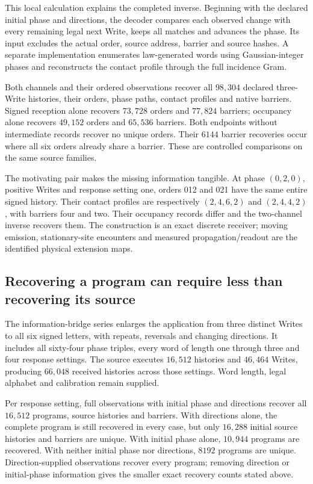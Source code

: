 This local calculation explains the completed inverse. Beginning with the declared initial phase and directions, the decoder compares each observed change with every remaining legal next Write, keeps all matches and advances the phase. Its input excludes the actual order, source address, barrier and source hashes. A separate implementation enumerates law-generated words using Gaussian-integer phases and reconstructs the contact profile through the full incidence Gram.

Both channels and their ordered observations recover all $98{,}304$ declared three-Write histories, their orders, phase paths, contact profiles and native barriers. Signed reception alone recovers $73{,}728$ orders and $77{,}824$ barriers; occupancy alone recovers $49{,}152$ orders and $65{,}536$ barriers. Both endpoints without intermediate records recover no unique orders. Their $6144$ barrier recoveries occur where all six orders already share a barrier. These are controlled comparisons on the same source families.

The motivating pair makes the missing information tangible. At phase $(0,2,0)$, positive Writes and response setting one, orders 012 and 021 have the same entire signed history. Their contact profiles are respectively $(2,4,6,2)$ and $(2,4,4,2)$, with barriers four and two. Their occupancy records differ and the two-channel inverse recovers them. The construction is an exact discrete receiver; moving emission, stationary-site encounters and measured propagation/readout are the identified physical extension maps.

\subsection{Recovering a program can require less than recovering its source}

The information-bridge series enlarges the application from three distinct Writes to all six signed letters, with repeats, reversals and changing directions. It includes all sixty-four phase triples, every word of length one through three and four response settings. The source executes $16{,}512$ histories and $46{,}464$ Writes, producing $66{,}048$ received histories across those settings. Word length, legal alphabet and calibration remain supplied. 

Per response setting, full observations with initial phase and directions recover all $16{,}512$ programs, source histories and barriers. With directions alone, the complete program is still recovered in every case, but only $16{,}288$ initial source histories and barriers are unique. With initial phase alone, $10{,}944$ programs are recovered. With neither initial phase nor directions, $8192$ programs are unique. Direction-supplied observations recover every program; removing direction or initial-phase information gives the smaller exact recovery counts stated above.

